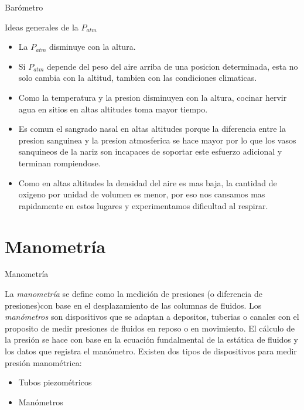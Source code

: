 \documentclass [xcolor=svgnames, t] {beamer}
\begin{document}
\begin{frame}{Bar\'ometro}
\begin{block}{Ideas generales de la $P_{atm}$}
\begin{itemize}
\item La $P_{atm}$ disminuye con la altura. 
\item Si $P_{atm}$ depende del peso del aire arriba de una posicion determinada, esta no solo cambia con la altitud, tambien con las condiciones climaticas.
\item Como la temperatura y la presion disminuyen con la altura, cocinar hervir agua en sitios en altas altitudes toma mayor tiempo.
\item Es comun el sangrado nasal en altas altitudes porque la diferencia entre la presion sanguinea y la presion atmosferica se hace mayor por lo que los vasos sanquineos de la nariz son incapaces de soportar este esfuerzo adicional y terminan rompiendose. 
\item Como en altas altitudes la densidad del aire es mas baja, la cantidad de oxigeno por unidad de volumen es menor, por eso nos cansamos mas rapidamente en estos lugares y experimentamos dificultad al respirar.
\end{itemize}
\end{block}
\end{frame}

\section{Manometr\'ia}
\begin{frame}{Manometr\'ia}
\begin{block}{}
La \emph{manometr\'ia} se define como la medici\'on de presiones (o diferencia de presiones)con base en el desplazamiento de las columnas de fluidos. Los \emph{man\'ometros} son dispositivos que se adaptan a depositos, tuberias o canales con el proposito de medir presiones de fluidos en reposo o en movimiento. El c\'alculo de la presi\'on se hace con base en la ecuaci\'on fundalmental de la est\'atica de fluidos y los datos que registra el man\'ometro.
Existen dos tipos de dispositivos para medir presi\'on manom\'etrica:
\begin{itemize}
\item Tubos piezom\'etricos
\item Man\'ometros 
\end{itemize}  
\end{block}
\end{frame}
\end{document}
